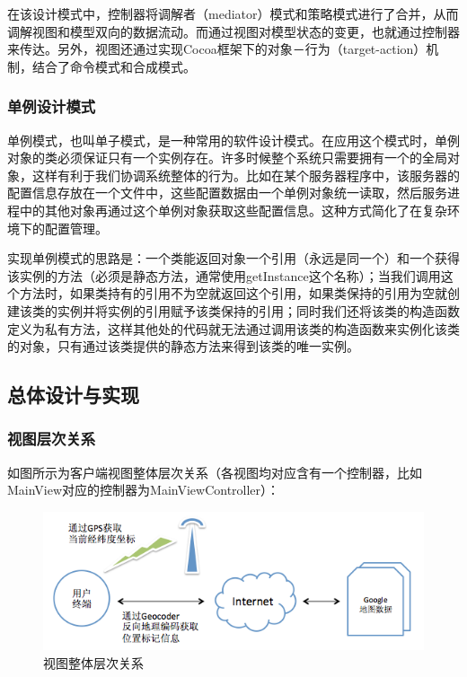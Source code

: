 \documentclass{article}
\begin{document}
\begin{CJK}{UTF8}{gbsn}
  在该设计模式中，控制器将调解者（mediator）模式和策略模式进行了合并，从而调解视图和模型双向的数据流动。而通过视图对模型状态的变更，也就通过控制器来传达。另外，视图还通过实现Cocoa框架下的对象－行为（target-action）机制，结合了命令模式和合成模式。\cite{iOSLIB} 

	\subsubsection{单例设计模式}
  单例模式，也叫单子模式，是一种常用的软件设计模式。在应用这个模式时，单例对象的类必须保证只有一个实例存在。许多时候整个系统只需要拥有一个的全局对象，这样有利于我们协调系统整体的行为。比如在某个服务器程序中，该服务器的配置信息存放在一个文件中，这些配置数据由一个单例对象统一读取，然后服务进程中的其他对象再通过这个单例对象获取这些配置信息。这种方式简化了在复杂环境下的配置管理。

  实现单例模式的思路是：一个类能返回对象一个引用（永远是同一个）和一个获得该实例的方法（必须是静态方法，通常使用getInstance这个名称）；当我们调用这个方法时，如果类持有的引用不为空就返回这个引用，如果类保持的引用为空就创建该类的实例并将实例的引用赋予该类保持的引用；同时我们还将该类的构造函数定义为私有方法，这样其他处的代码就无法通过调用该类的构造函数来实例化该类的对象，只有通过该类提供的静态方法来得到该类的唯一实例。\cite{WIKI}

	\subsection{总体设计与实现}
	\subsubsection{视图层次关系}
  如图所示为客户端视图整体层次关系（各视图均对应含有一个控制器，比如MainView对应的控制器为MainViewController）：

  \begin{figure}[htbp]
		\centering
		\includegraphics[bb=0 0 548 341, scale=0.45]{figure/fig_n03.png}
		\caption{视图整体层次关系}
		\label{fig:n03}
	\end{figure}


\end{CJK}
\end{document}
